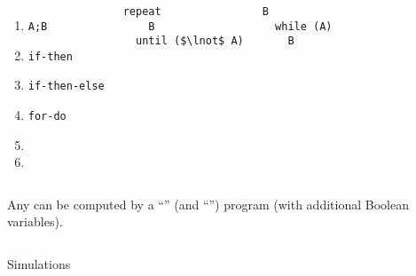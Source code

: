\begin{frame}[fragile]{}
  \begin{columns}
      \begin{enumerate}[(1)]
	\item \texttt{A;B}
	\item \texttt{if-then} 
	\item \texttt{if-then-else} 
	\item \texttt{for-do} 
	\item {} 
	\item {}
      \end{enumerate}
      \pause
      \begin{lstlisting}[style = Cstyle, backgroundcolor = \color{teal!10!lightgray}]
  repeat
    B
  until ($\lnot$ A)
      \end{lstlisting}
      \pause
      \begin{lstlisting}[style = Cstyle]
  B
  while (A)
    B
      \end{lstlisting}
  \end{columns}

  \vspace{0.60cm}
  \pause
  \begin{theorem}
     Any  can be computed by a 
    ``'' (and ``\red{\textsf{;}}'') program
    (with additional Boolean variables).
  \end{theorem}
\end{frame}

\begin{frame}{}

  \begin{columns}
  \end{columns}

  Simulations
\end{frame}

% 
%       

